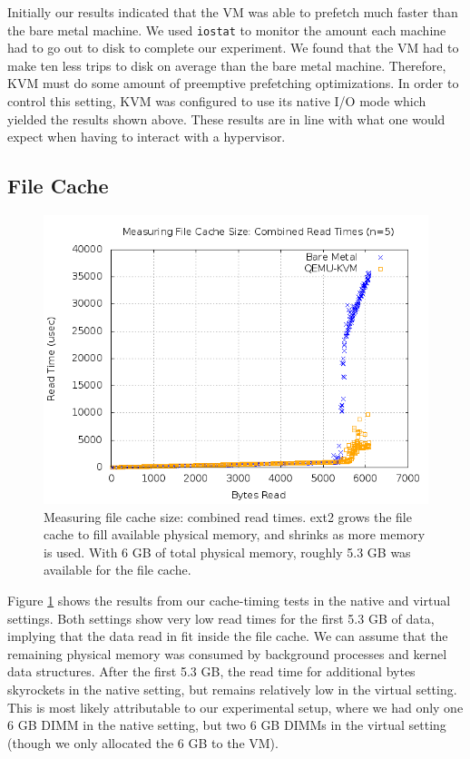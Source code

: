 \documentclass[letterpaper,twocolumn,10pt]{article}
\begin{document}
Initially our results indicated that the VM was able to prefetch much faster than the bare metal machine. 
We used \texttt{iostat} to monitor the amount each machine had to go out to disk to complete our experiment. 
We found that the VM had to make ten less trips to disk on average than the bare metal machine.
Therefore, KVM must do some amount of preemptive prefetching optimizations.
In order to control this setting, KVM was configured to use its native I/O mode which yielded the results shown above.
These results are in line with what one would expect when having to interact with a hypervisor.

\subsection{File Cache}
\begin{figure}[!ht]
\includegraphics[scale=.35]{combined_graphs/cache_combined.png}
\caption{Measuring file cache size: combined read times. ext2 grows the file cache to fill available physical memory, and shrinks as more memory is used. With 6 GB of total physical memory, roughly 5.3 GB was available for the file cache.}
\label{fig:file_cache}
\end{figure}
Figure \ref{fig:file_cache} shows the results from our cache-timing tests in the native and virtual settings. 
Both settings show very low read times for the first 5.3 GB of data, implying that the data read in fit inside the file cache. 
We can assume that the remaining physical memory was consumed by background processes and kernel data structures. 
After the first 5.3 GB, the read time for additional bytes skyrockets in the native setting, but remains relatively low in the virtual setting. 
This is most likely attributable to our experimental setup, where we had only one 6 GB DIMM in the native setting, but two 6 GB DIMMs in the virtual setting (though we only allocated the 6 GB to the VM). 
\end{document}
